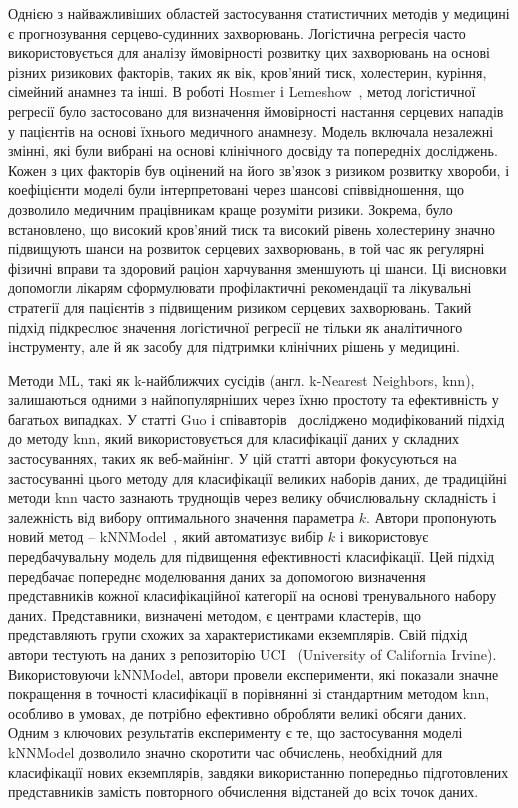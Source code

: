 Однією з найважливіших областей застосування статистичних методів у медицині є прогнозування серцево-судинних захворювань. Логістична регресія часто використовується для аналізу ймовірності розвитку цих захворювань на основі різних ризикових факторів, таких як вік, кров'яний тиск, холестерин, куріння, сімейний анамнез та інші. В роботі Hosmer і Lemeshow~\cite{ct12}, метод логістичної регресії було застосовано для визначення ймовірності настання серцевих нападів у пацієнтів на основі їхнього медичного анамнезу. Модель включала незалежні змінні, які були вибрані на основі клінічного досвіду та попередніх досліджень. Кожен з цих факторів був оцінений на його зв'язок з ризиком розвитку хвороби, і коефіцієнти моделі були інтерпретовані через шансові співвідношення, що дозволило медичним працівникам краще розуміти ризики. Зокрема, було встановлено, що високий кров'яний тиск та високий рівень холестерину значно підвищують шанси на розвиток серцевих захворювань, в той час як регулярні фізичні вправи та здоровий раціон харчування зменшують ці шанси. Ці висновки допомогли лікарям сформулювати профілактичні рекомендації та лікувальні стратегії для пацієнтів з підвищеним ризиком серцевих захворювань. Такий підхід підкреслює значення логістичної регресії не тільки як аналітичного інструменту, але й як засобу для підтримки клінічних рішень у медицині.

Методи ML, такі як k-найближчих сусідів (англ. k-Nearest Neighbors, knn), залишаються одними з найпопулярніших через їхню простоту та ефективність у багатьох випадках. У статті Guo і співавторів~\cite{ct13} досліджено модифікований підхід до методу knn, який використовується для класифікації даних у складних застосуваннях, таких як веб-майнінг. У цій статті автори фокусуються на застосуванні цього методу для класифікації великих наборів даних, де традиційні методи knn часто зазнають труднощів через велику обчислювальну складність і залежність від вибору оптимального значення параметра \( k \). Автори пропонують новий метод -- kNNModel~\cite{ct13}, який автоматизує вибір \( k \) і використовує передбачувальну модель для підвищення ефективності класифікації. Цей підхід передбачає попереднє моделювання даних за допомогою визначення представників кожної класифікаційної категорії на основі тренувального набору даних. Представники, визначені методом, є центрами кластерів, що представляють групи схожих за характеристиками екземплярів. Свій підхід автори тестують на даних з репозиторію UCI~\cite{ct38} (University of California Irvine). Використовуючи kNNModel, автори провели експерименти, які показали значне покращення в точності класифікації в порівнянні зі стандартним методом knn, особливо в умовах, де потрібно ефективно обробляти великі обсяги даних. Одним з ключових результатів експерименту є те, що застосування моделі kNNModel дозволило значно скоротити час обчислень, необхідний для класифікації нових екземплярів, завдяки використанню попередньо підготовлених представників замість повторного обчислення відстаней до всіх точок даних.

